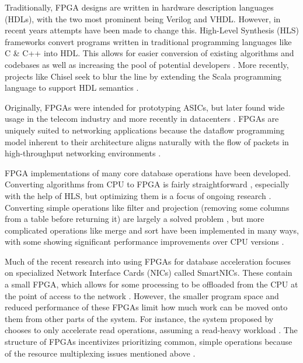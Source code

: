 Traditionally, FPGA designs are written in hardware description languages
(HDLs), with the two most prominent being Verilog and VHDL. However, in recent
years attempts have been made to change this. High-Level Synthesis (HLS)
frameworks convert programs written in traditional programming languages like C
\& C++ into HDL. This allows for easier conversion of existing algorithms and
codebases as well as increasing the pool of potential developers
\autocite{martin-destest-2009}. More recently, projects like Chisel seek to blur
the line by extending the Scala programming language to support HDL semantics
\autocite{chisel}.

Originally, FPGAs were intended for prototyping ASICs, but later found wide
usage in the telecom industry \autocite{bobda-trets-2022,mencer-queue-2020} and
more recently in datacenters \autocite{mencer-queue-2020,hoozemans-cas-2021}.
FPGAs are uniquely suited to networking applications because the dataflow
programming model \autocite{hoozemans-cas-2021} inherent to their architecture
aligns naturally with the flow of packets in high-throughput networking
environments \autocite{mueller-sigmod-2009}.


\label{sec:datacenter-fpga}

FPGA implementations of many core database operations have been developed.
Converting algorithms from CPU to FPGA is fairly straightforward
\autocite{fang-vldb-2020}, especially with the help of HLS, but optimizing them
is a focus of ongoing research \autocite{fang-vldb-2020}. Converting simple
operations like filter and projection (removing some columns from a table before
returning it) are largely a solved problem \autocite{fang-vldb-2020}, but more
complicated operations like merge and sort have been implemented in many ways,
with some showing significant performance improvements over CPU versions
\autocite{leggett-trets-2025,moghaddamfar-damon-2021}.

Much of the recent research into using FPGAs for database acceleration focuses
on specialized Network Interface Cards (NICs) called SmartNICs. These contain a
small FPGA, which allows for some processing to be offloaded from the CPU at the
point of access to the network \autocite{strom,honeycomb}. However, the smaller
program space and reduced performance of these FPGAs limit how much work can be
moved onto them from other parts of the system. For instance, the
 system proposed by \citeauthor{honeycomb} chooses to only
accelerate read operations, assuming a read-heavy workload \autocite{honeycomb}.
The structure of FPGAs incentivizes prioritizing common, simple operations
because of the resource multiplexing issues mentioned above
\autocite{honeycomb,moghaddamfar-damon-2021}.
